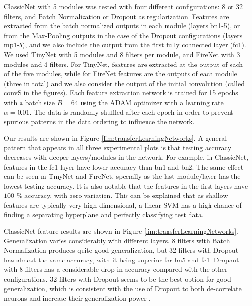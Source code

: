 ClassicNet with 5 modules was tested with four different configurations: 8 or 32 filters, and Batch Normalization or Dropout as regularization. Features are extracted from the batch normalized outputs in each module (layers bn1-5), or from the Max-Pooling outputs in the case of the Dropout configurations (layers mp1-5), and we also include the output from the first fully connected layer (fc1). We used TinyNet with 5 modules and 8 filters per module, and FireNet with 3 modules and 4 filters. For TinyNet, features are extracted at the output of each of the five modules, while for FireNet features are the outputs of each module (three in total) and we also consider the output of the initial convolution (called convS in the figures). Each feature extraction network is trained for 15 epochs with a batch size $B = 64$ using the ADAM optimizer \cite{kingma2014adam} with a learning rate $\alpha = 0.01$. The data is randomly shuffled after each epoch in order to prevent spurious patterns in the data ordering to influence the network.

Our results are shown in Figure \ref{lim:transferLearningNetworks}. A general pattern that appears in all three experimental plots is that testing accuracy decreases with deeper layers/modules in the network. For example, in ClassicNet, features in the fc1 layer have lower accuracy than bn1 and bn2. The same effect can be seen in TinyNet and FireNet, specially as the last module/layer has the lowest testing accuracy. It is also notable that the features in the first layers have $100$ \% accuracy, with zero variation. This can be explained that as shallow features are typically very high dimensional, a linear SVM has a high chance of finding a separating hyperplane and perfectly classifying test data.

ClassicNet feature results are shown in Figure \ref{lim:transferLearningNetworks}. Generalization varies considerably with different layers. 8 filters with Batch Normalization produces quite good generalization, but 32 filters with Dropout has almost the same accuracy, with it being superior for bn5 and fc1. Dropout with 8 filters has a considerable drop in accuracy compared with the other configurations. 32 filters with Dropout seems to be the best option for good generalization, which is consistent with the use of Dropout to both de-correlate neurons and increase their generalization power \cite{srivastava2014dropout}.

